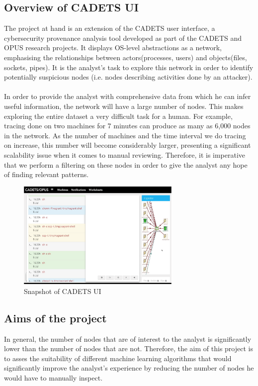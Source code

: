 	\subsection{Overview of CADETS UI}\label{1.1.1}
	The project at hand is an extension of the CADETS user interface, a cybersecurity provenance analysis tool developed as part of the CADETS and OPUS research projects. It displays OS-level abstractions as a network, emphasising the relationships between actors(processes, users) and objects(files, sockets, pipes). It is the analyst's task to explore this network in order to identify potentially suspicious nodes (i.e. nodes describing activities done by an attacker). 
	\\ \\
	In order to provide the analyst with comprehensive data from which he can infer useful information, the network will have a large number of nodes. This makes exploring the entire dataset a very difficult task for a human.  For example, tracing done on two machines for 7 minutes can produce as many as 6,000 nodes in the network. As the number of machines and the time interval we do tracing on increase, this number will become considerably larger, presenting a significant scalability issue when it comes to manual reviewing. Therefore, it is imperative that we perform a filtering on these nodes in order to give the analyst any hope of finding relevant patterns.
	\begin{figure}[H]
		\centering
		\includegraphics[width=0.7\textwidth]{graphics/CADETS}
		\caption{Snapshot of CADETS UI}
		\label{Figure 1.1}
	\end{figure}
	
	\subsection{Aims of the project}
	In general, the number of nodes that are of interest to the analyst is significantly lower than the number of nodes that are not. Therefore, the aim of this project is to asses the suitability of different machine learning algorithms that would significantly improve the analyst's experience by reducing the number of nodes he would have to manually inspect. 
	
